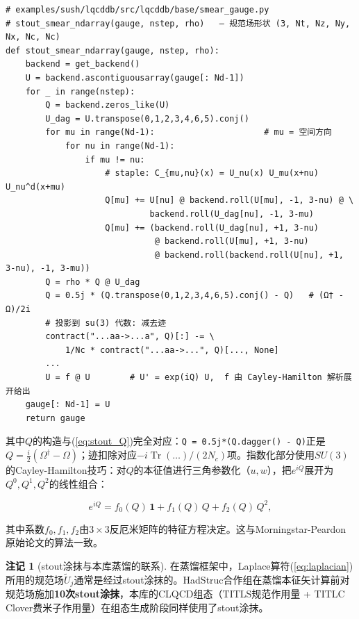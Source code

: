 \documentclass[12pt,a4paper]{ctexart}
\theoremstyle{definition}
\newtheorem{remark}{注记}[section]
\begin{document}
\begin{verbatim}
# examples/sush/lqcddb/src/lqcddb/base/smear_gauge.py
# stout_smear_ndarray(gauge, nstep, rho)   — 规范场形状 (3, Nt, Nz, Ny, Nx, Nc, Nc)
def stout_smear_ndarray(gauge, nstep, rho):
    backend = get_backend()
    U = backend.ascontiguousarray(gauge[: Nd-1])
    for _ in range(nstep):
        Q = backend.zeros_like(U)
        U_dag = U.transpose(0,1,2,3,4,6,5).conj()
        for mu in range(Nd-1):                      # mu = 空间方向
            for nu in range(Nd-1):
                if mu != nu:
                    # staple: C_{mu,nu}(x) = U_nu(x) U_mu(x+nu) U_nu^d(x+mu)
                    Q[mu] += U[nu] @ backend.roll(U[mu], -1, 3-nu) @ \
                             backend.roll(U_dag[nu], -1, 3-mu)
                    Q[mu] += (backend.roll(U_dag[nu], +1, 3-nu)
                              @ backend.roll(U[mu], +1, 3-nu)
                              @ backend.roll(backend.roll(U[nu], +1, 3-nu), -1, 3-mu))
        Q = rho * Q @ U_dag
        Q = 0.5j * (Q.transpose(0,1,2,3,4,6,5).conj() - Q)   # (Ω† - Ω)/2i
        # 投影到 su(3) 代数: 减去迹
        contract("...aa->...a", Q)[:] -= \
            1/Nc * contract("...aa->...", Q)[..., None]
        ...
        U = f @ U        # U' = exp(iQ) U,  f 由 Cayley-Hamilton 解析展开给出
    gauge[: Nd-1] = U
    return gauge
\end{verbatim}

其中$Q$的构造与(\ref{eq:stout_Q})完全对应：\texttt{Q = 0.5j*(Q.dagger() - Q)}正是$Q = \tfrac{i}{2}(\Omega^\dagger - \Omega)$；迹扣除对应$-i\operatorname{Tr}(\ldots)/(2N_c)$项。指数化部分使用$SU(3)$的Cayley-Hamilton技巧：对$Q$的本征值进行三角参数化（$u, w$），把$e^{iQ}$展开为$Q^0, Q^1, Q^2$的线性组合：

\begin{equation}
e^{iQ} = f_0(Q)\, \mathbf{1} + f_1(Q)\, Q + f_2(Q)\, Q^2,
\label{eq:cayley_hamilton}
\end{equation}

其中系数$f_0, f_1, f_2$由$3\times 3$反厄米矩阵的特征方程决定。这与Morningstar-Peardon原始论文的算法一致\cite{Morningstar2004}。

\begin{remark}[stout涂抹与本库蒸馏的联系]
\label{rem:stout_distill}
在蒸馏框架中，Laplace算符(\ref{eq:laplacian})所用的规范场$\tilde U_j$通常是经过stout涂抹的。HadStruc合作组\cite{Egerer2021a,Egerer2022}在蒸馏本征矢计算前对规范场施加\textbf{10次stout涂抹}，本库的CLQCD组态（TITLS规范作用量 + TITLC Clover费米子作用量）在组态生成阶段同样使用了stout涂抹\cite{CLQCD2024,CLQCD2025}。
\end{remark}
\end{document}
